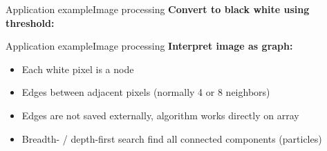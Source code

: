 \begin{frame}{Application example}{Image processing}
  \textbf{Convert to black white using threshold:}\\
  \begin{center}
    \begin{adjustbox}{width=0.8\linewidth}
      
    \end{adjustbox}
  \end{center}
\end{frame}


\begin{frame}{Application example}{Image processing}
  \textbf{Interpret image as graph:}
  \begin{itemize}
    \item<2->
      Each white pixel is a node
    \item<3->
      Edges between adjacent pixels (normally 4 or 8 neighbors)
    \item<4->
      Edges are not saved externally,
      algorithm works directly on array
    \item<5->
      Breadth- / depth-first search find all connected components (particles)
  \end{itemize}
\end{frame}


